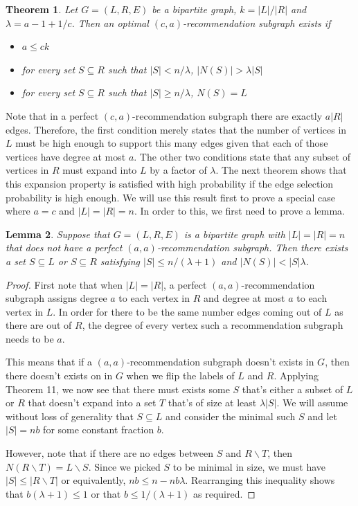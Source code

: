 \documentclass[11pt]{article}
\newtheorem{thm}{Theorem}
\newtheorem{lem}[thm]{Lemma}
\newcommand{\vs}{\vspace{0.2cm}}
\begin{document}
\begin{thm}
Let $G=(L,R,E)$ be a bipartite graph, $k=|L|/|R|$ and $\lambda = a - 1 + 1/c$. Then an optimal $(c,a)$-recommendation subgraph exists if 

\begin{itemize}
\item $a \leq ck$
\item for every set $S\subseteq R$ such that $|S| < n/\lambda$, $|N(S)| > \lambda|S|$
\item for every set $S\subseteq R$ such that $|S| \geq n/\lambda$, $N(S) = L$
\end{itemize}
\end{thm}
 
Note that in a perfect $(c,a)$-recommendation subgraph there are exactly $a|R|$ edges. Therefore, the first condition merely states that the number of vertices in $L$ must be high enough to support this many edges given that each of those vertices have degree at most $a$. The other two conditions state that any subset of vertices in $R$ must expand into $L$ by a factor of $\lambda$. The next theorem shows that this expansion property is satisfied with high probability if the edge selection probability is high enough. We will use this result first to prove a special case where $a=c$ and $|L|=|R|=n$. In order to this, we first need to prove a lemma.

\begin{lem}
Suppose that $G=(L,R,E)$ is a bipartite graph with $|L|=|R|=n$ that does not have a perfect $(a,a)$-recommendation subgraph. Then there exists a set $S\subseteq L$ or $S\subseteq R$ satisfying $|S|\leq n/(\lambda+1)$ and $|N(S)| < |S|\lambda$.
\end{lem}

\begin{proof}
First note that when $|L|=|R|$, a perfect $(a,a)$-recommendation subgraph assigns degree $a$ to each vertex in $R$ and degree at most $a$ to each vertex in $L$. In order for there to be the same number edges coming out of $L$ as there are out of $R$, the degree of every vertex such a recommendation subgraph needs to be $a$.\vs

This means that if a $(a,a)$-recommendation subgraph doesn't exists in $G$, then there doesn't exists on in $G$ when we flip the labels of $L$ and $R$. Applying Theorem 11, we now see that there must exists some $S$ that's either a subset of $L$ or $R$ that doesn't expand into a set $T$ that's of size at least $\lambda|S|$. We will assume without loss of generality that $S\subseteq L$ and consider the minimal such $S$ and let $|S|=nb$ for some constant fraction $b$. \vs

However, note that if there are no edges between $S$ and $R\backslash T$, then $N(R\backslash T) = L\backslash S$. Since we picked $S$ to be minimal in size, we must have $|S|\leq |R\backslash T|$ or equivalently, $nb \leq n -nb\lambda$. Rearranging this inequality shows that $b(\lambda+1) \leq 1$ or that $b\leq 1/(\lambda+1)$ as required.
\end{proof}
\end{document}
